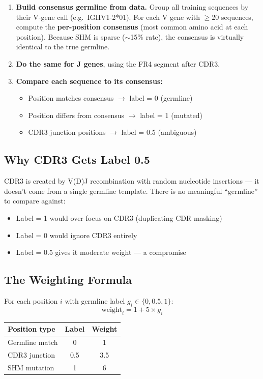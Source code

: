 \documentclass[11pt]{article}
\begin{document}
\begin{enumerate}
\item \textbf{Build consensus germline from data.} Group all
      training sequences by their V-gene call (e.g.\ IGHV1-2*01).
      For each V gene with $\geq$20 sequences, compute the
      \textbf{per-position consensus} (most common amino acid at
      each position). Because SHM is sparse ($\sim$15\% rate),
      the consensus is virtually identical to the true germline.
\item \textbf{Do the same for J genes}, using the FR4 segment
      after CDR3.
\item \textbf{Compare each sequence to its consensus:}
      \begin{itemize}
          \item Position matches consensus $\to$ label = 0
                (germline)
          \item Position differs from consensus $\to$ label = 1
                (mutated)
          \item CDR3 junction positions $\to$ label = 0.5
                (ambiguous)
      \end{itemize}
\end{enumerate}

\subsection{Why CDR3 Gets Label 0.5}
CDR3 is created by V(D)J recombination with random nucleotide
insertions --- it doesn't come from a single germline template.
There is no meaningful ``germline'' to compare against:
\begin{itemize}
\item Label = 1 would over-focus on CDR3 (duplicating CDR masking)
\item Label = 0 would ignore CDR3 entirely
\item Label = 0.5 gives it moderate weight --- a compromise
\end{itemize}

\subsection{The Weighting Formula}
For each position $i$ with germline label $g_i \in \{0, 0.5, 1\}$:
\[
\text{weight}_i = 1 + 5 \times g_i
\]
\begin{center}
\begin{tabular}{lcc}
\toprule
Position type & Label & Weight \\
\midrule
Germline match & 0 & 1 \\
CDR3 junction & 0.5 & 3.5 \\
SHM mutation & 1 & 6 \\
\bottomrule
\end{tabular}
\end{center}
\end{document}
